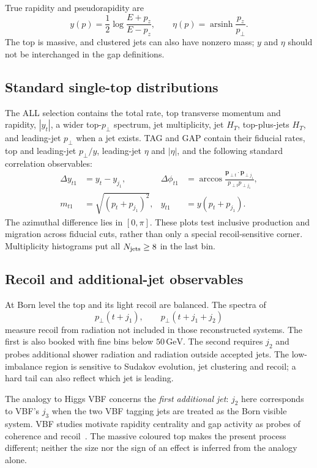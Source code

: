 \documentclass[11pt,a4paper]{article}
\newcommand{\GeV}{\,\mathrm{GeV}}
\begin{document}
True rapidity and pseudorapidity are
\begin{equation}
 y(p)=\frac12\log\frac{E+p_z}{E-p_z},\qquad
 \eta(p)=\operatorname{arsinh}\frac{p_z}{p_\perp}.
\end{equation}
The top is massive, and clustered jets can also have nonzero mass; $y$ and
$\eta$ should not be interchanged in the gap definitions.

\subsection{Standard single-top distributions}

The ALL selection contains the total rate, top transverse momentum and
rapidity, $|y_t|$, a wider top-$p_\perp$ spectrum, jet multiplicity, jet
$H_T$, top-plus-jets $H_T$, and leading-jet $p_\perp$ when a jet exists.
TAG and GAP contain their fiducial rates, top and leading-jet $p_\perp/y$,
leading-jet $\eta$ and $|\eta|$, and the following standard correlation
observables:
\begin{align}
 \Delta y_{t1}&=y_t-y_{j_1},&
 \Delta\phi_{t1}&=\arccos\frac{\boldsymbol p_{\perp t}\cdot
                  \boldsymbol p_{\perp j_1}}{p_{\perp t}p_{\perp j_1}},\\
 m_{t1}&=\sqrt{(p_t+p_{j_1})^2},&
 y_{t1}&=y(p_t+p_{j_1}).
\end{align}
The azimuthal difference lies in $[0,\pi]$. These plots test inclusive
production and migration across fiducial cuts, rather than only a special
recoil-sensitive corner. Multiplicity histograms put all $N_{\rm jets}\geq8$
in the last bin.

\subsection{Recoil and additional-jet observables}

At Born level the top and its light recoil are balanced. The spectra of
\begin{equation}
 p_\perp(t+j_1),\qquad
 p_\perp(t+j_1+j_2)
\end{equation}
measure recoil from radiation not included in those reconstructed systems.
The first is also booked with fine bins below $50\GeV$. The second requires
$j_2$ and probes additional shower radiation and radiation outside accepted
jets. The low-imbalance region is sensitive to Sudakov evolution, jet
clustering and recoil; a hard tail can also reflect which jet is leading.

The analogy to Higgs VBF concerns the \emph{first additional jet}: $j_2$
here corresponds to VBF's $j_3$ when the two VBF tagging jets are treated
as the Born visible system. VBF studies motivate rapidity centrality and
gap activity as probes of coherence and recoil~\cite{VBFJager,VBFHoche}.
The massive coloured top makes the present process different; neither the
size nor the sign of an effect is inferred from the analogy alone.
\end{document}
